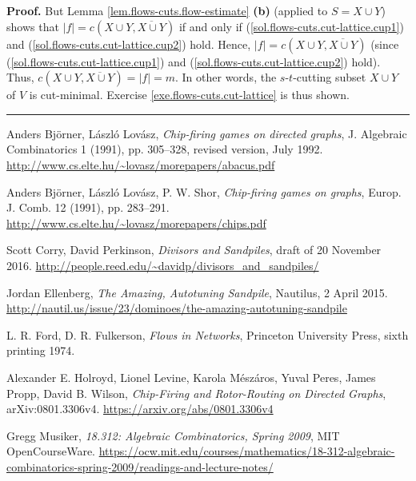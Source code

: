 \documentclass[numbers=enddot,12pt,final,onecolumn,notitlepage]{scrartcl}%
\theoremstyle{definition}
\newenvironment{proof}[1][Proof]{\noindent\textbf{#1.} }{\ \rule{0.5em}{0.5em}}
\begin{document}
\begin{proof}
But Lemma \ref{lem.flows-cuts.flow-estimate} \textbf{(b)} (applied to $S=X\cup
Y$) shows that $\left\vert f\right\vert =c\left(  X\cup Y,\overline{X\cup
Y}\right)  $ if and only if (\ref{sol.flows-cuts.cut-lattice.cup1}) and
(\ref{sol.flows-cuts.cut-lattice.cup2}) hold. Hence, $\left\vert f\right\vert
=c\left(  X\cup Y,\overline{X\cup Y}\right)  $ (since
(\ref{sol.flows-cuts.cut-lattice.cup1}) and
(\ref{sol.flows-cuts.cut-lattice.cup2}) hold). Thus, $c\left(  X\cup
Y,\overline{X\cup Y}\right)  =\left\vert f\right\vert =m$. In other words, the
$s$-$t$-cutting subset $X\cup Y$ of $V$ is cut-minimal. Exercise
\ref{exe.flows-cuts.cut-lattice} is thus shown.
\end{proof}

\begin{thebibliography}{99999999}

Anders Bj\"orner, L\'aszl\'o Lov\'asz,
\textit{Chip-firing games on directed graphs},
J. Algebraic Combinatorics 1 (1991), pp. 305--328,
revised version, July 1992.
\newline\url{http://www.cs.elte.hu/~lovasz/morepapers/abacus.pdf}

Anders Bj\"orner, L\'aszl\'o Lov\'asz, P. W. Shor,
\textit{Chip-firing games on graphs},
Europ. J. Comb. 12 (1991), pp. 283--291.
\newline\url{http://www.cs.elte.hu/~lovasz/morepapers/chips.pdf}

Scott Corry, David Perkinson,
\textit{Divisors and Sandpiles},
draft of 20 November 2016.
\newline\url{http://people.reed.edu/~davidp/divisors_and_sandpiles/}

Jordan Ellenberg,
\textit{The Amazing, Autotuning Sandpile},
Nautilus, 2 April 2015.
\newline\url{http://nautil.us/issue/23/dominoes/the-amazing-autotuning-sandpile}

L. R. Ford, D. R. Fulkerson,
\textit{Flows in Networks},
Princeton University Press,
sixth printing 1974.

Alexander E. Holroyd, Lionel Levine, Karola M\'esz\'aros,
Yuval Peres, James Propp, David B. Wilson,
\textit{Chip-Firing and Rotor-Routing on Directed Graphs},
arXiv:0801.3306v4.
\newline\url{https://arxiv.org/abs/0801.3306v4}

Gregg Musiker,
\textit{18.312: Algebraic Combinatorics, Spring 2009},
MIT OpenCourseWare.
\newline\url{https://ocw.mit.edu/courses/mathematics/18-312-algebraic-combinatorics-spring-2009/readings-and-lecture-notes/}


\end{thebibliography}
\end{document}
